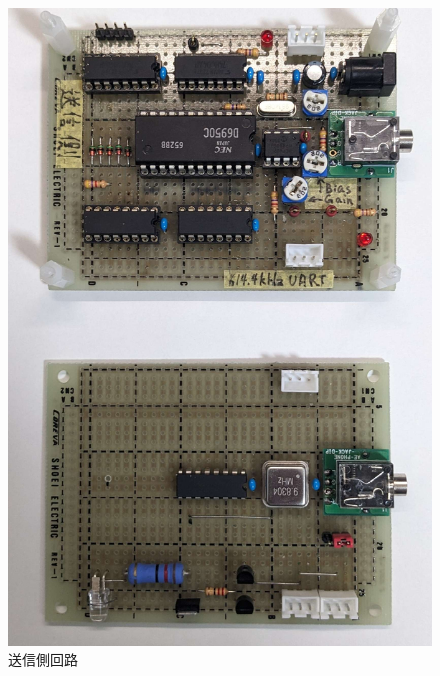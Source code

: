 \documentclass[a4paper,10pt]{article}
\begin{document}
\begin{multicols}{2}[\raggedcolumns]
\begin{figure}[H]
    \centering
    \includegraphics[width=0.8\linewidth]{figure/sosin.jpg} 
    \caption{送信側回路} 
    \label{fig:sosin}
\end{figure}


\end{multicols}
\end{document}

